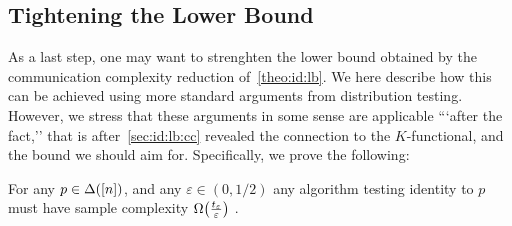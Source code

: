 \documentclass[11pt]{article}
\theoremstyle{remark}   	\newtheorem{remark}[theorem]{Remark}
\theoremstyle{definition}   	\newaliascnt{defn}{theorem}
\newcommand{\eps}{\ensuremath{\varepsilon}\xspace}
\newcommand{\bigOmega}[1]{{\Omega\mleft( #1 \mright)}}
\begin{document}
\subsection{Tightening the Lower Bound}\label{sec:id:lb}
As a last step, one may want to strenghten the lower bound obtained by the communication complexity reduction of~\autoref{theo:id:lb}. We here describe how this can be achieved using more standard arguments from distribution testing. However, we stress that these arguments in some sense are applicable ```after the fact,'' that is after~\autoref{sec:id:lb:cc} revealed the connection to the $K$-functional, and the bound we should aim for. Specifically, we prove the following:
\begin{theorem}\label{theo:id:lb:noncc}
  For any $p\in\Delta\!\left([n]\right)$, and any $\eps\in(0,1/2)$ any algorithm testing identity to $p$ must have sample complexity
  $
    \bigOmega{\frac{t_{\eps}}{\eps}}
  $
  .
\end{theorem}
\end{document}

